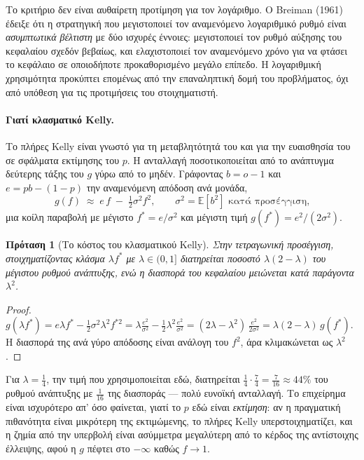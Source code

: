 \documentclass[12pt,a4paper,oneside]{report}
\renewcommand{\_}{\oldunderscore\allowbreak}
\theoremstyle{definition}
\theoremstyle{plain}
\newtheorem{proposition}[theorem]{Πρόταση}
\theoremstyle{remark}
\begin{document}
Το κριτήριο δεν είναι αυθαίρετη προτίμηση για τον λογάριθμο. Ο Breiman (1961) έδειξε ότι η
στρατηγική που μεγιστοποιεί τον αναμενόμενο λογαριθμικό ρυθμό είναι \emph{ασυμπτωτικά
βέλτιστη} με δύο ισχυρές έννοιες: μεγιστοποιεί τον ρυθμό αύξησης του κεφαλαίου σχεδόν
βεβαίως, και ελαχιστοποιεί τον αναμενόμενο χρόνο για να φτάσει το κεφάλαιο σε οποιοδήποτε
προκαθορισμένο μεγάλο επίπεδο. Η λογαριθμική χρησιμότητα προκύπτει επομένως από την
επαναληπτική δομή του προβλήματος, όχι από υπόθεση για τις προτιμήσεις του στοιχηματιστή.

\paragraph{Γιατί κλασματικό Kelly.} Το πλήρες Kelly είναι γνωστό για τη μεταβλητότητά του και
για την ευαισθησία του σε σφάλματα εκτίμησης του $p$. Η ανταλλαγή ποσοτικοποιείται από το
ανάπτυγμα δεύτερης τάξης του $g$ γύρω από το μηδέν. Γράφοντας $b=o-1$ και
$e = pb-(1-p)$ την αναμενόμενη απόδοση ανά μονάδα,
\[
g(f) \;\approx\; e\,f \;-\; \tfrac12 \sigma^2 f^2, \qquad \sigma^2 = \mathbb{E}[b^2] \text{ κατά προσέγγιση,}
\]
μια κοίλη παραβολή με μέγιστο $f^{*}=e/\sigma^2$ και μέγιστη τιμή $g(f^{*}) = e^2/(2\sigma^2)$.

\begin{proposition}[Το κόστος του κλασματικού Kelly]
\label{prop:fractional-kelly}
Στην τετραγωνική προσέγγιση, στοιχηματίζοντας κλάσμα $\lambda f^{*}$ με $\lambda\in(0,1]$
διατηρείται ποσοστό $\lambda(2-\lambda)$ του μέγιστου ρυθμού ανάπτυξης, ενώ η διασπορά του
κεφαλαίου μειώνεται κατά παράγοντα $\lambda^2$.
\end{proposition}

\begin{proof}
$g(\lambda f^{*}) = e\lambda f^{*} - \tfrac12\sigma^2\lambda^2 f^{*2}
= \lambda \frac{e^2}{\sigma^2} - \tfrac12 \lambda^2 \frac{e^2}{\sigma^2}
= (2\lambda-\lambda^2)\, \frac{e^2}{2\sigma^2} = \lambda(2-\lambda)\, g(f^{*})$.
Η διασπορά της ανά γύρο απόδοσης είναι ανάλογη του $f^2$, άρα κλιμακώνεται ως $\lambda^2$.
\end{proof}

Για $\lambda=\tfrac14$, την τιμή που χρησιμοποιείται εδώ, διατηρείται
$\tfrac14\cdot\tfrac74 = \tfrac{7}{16} \approx 44\%$ του ρυθμού ανάπτυξης με $\tfrac{1}{16}$
της διασποράς --- πολύ ευνοϊκή ανταλλαγή. Το επιχείρημα είναι ισχυρότερο απ' όσο φαίνεται,
γιατί το $p$ εδώ είναι \emph{εκτίμηση}: αν η πραγματική πιθανότητα είναι μικρότερη της
εκτιμώμενης, το πλήρες Kelly υπερστοιχηματίζει, και η ζημία από την υπερβολή είναι
ασύμμετρα μεγαλύτερη από το κέρδος της αντίστοιχης έλλειψης, αφού η $g$ πέφτει στο
$-\infty$ καθώς $f\to 1$.
\end{document}
